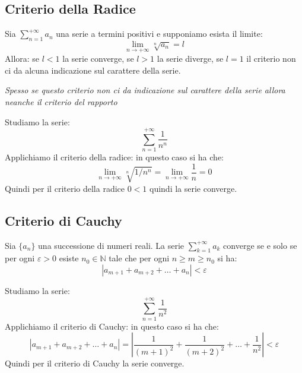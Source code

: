     \subsection{Criterio della Radice}
        \begin{definizione}
            Sia \emph{$\sum_{n=1}^{+\infty}a_n$} una serie a termini positivi e supponiamo esista il limite:
            \[ \lim_{n \to +\infty} \sqrt[n]{a_n} = l \]
            Allora: se $l < 1$ la serie converge, se $l > 1$ la serie diverge, se $l = 1$ il criterio non ci da alcuna indicazione sul carattere della serie.
        \end{definizione} 
        
    \emph{Spesso se questo criterio non ci da indicazione sul carattere della serie allora neanche il criterio del rapporto}


        \begin{esempio}
        Studiamo la serie:
            \[ \sum_{n=1}^{+\infty} \frac{1}{n^n} \]
        Applichiamo il criterio della radice:
        in questo caso si ha che:
        \begin{equation} \lim_{n \to +\infty} \sqrt[n]{1/n^n} = \lim_{n \to +\infty} \frac{1}{n} = 0
        \end{equation}
        Quindi per il criterio della radice $0<1$ quindi la serie converge.
            \end{esempio}
    \subsection{Criterio di Cauchy}
            \begin{definizione}
                    Sia $\{a_n\}$ una successione di numeri reali. La serie $\sum_{k=1}^{+\infty} a_k$ converge se e solo se per ogni $\varepsilon > 0$ esiste $n_0 \in \mathbb{N}$ tale che per ogni $n \geq m \geq n_0$ si ha:
                      \[ |a_{m+1} + a_{m+2} + \ldots + a_n| < \varepsilon \]
            \end{definizione}
    \begin{esempio}
        Studiamo la serie:
            \[ \sum_{n=1}^{+\infty} \frac{1}{n^2} \]
        Applichiamo il criterio di Cauchy:
        in questo caso si ha che:
        \begin{equation} |a_{m+1} + a_{m+2} + \ldots + a_n| = \left| \frac{1}{(m+1)^2} + \frac{1}{(m+2)^2} + \ldots + \frac{1}{n^2} \right| < \varepsilon
        \end{equation}
        Quindi per il criterio di Cauchy la serie converge.
    \end{esempio}
